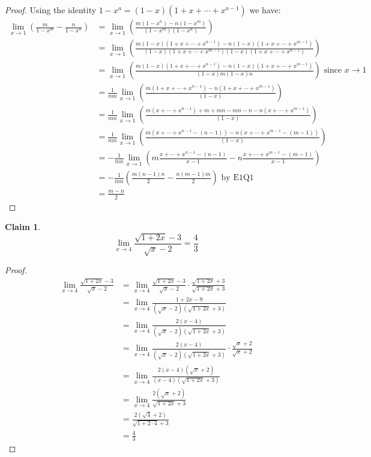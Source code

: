 \documentclass{homework}
\newcommand{\ra}{\rightarrow}
\newcommand{\?}{\stackrel{?}{=}}
\theoremstyle{definition}
\newtheorem*{claim}{Claim}
\begin{document}
\begin{proof}
    Using the identity $1-x^a=(1-x)(1+x+\cdots+x^{a-1})$ we have:
    \begin{align*}
        \lim_{x\ra1}\left( \frac{m}{1-x^m}-\frac{n}{1-x^n} \right) &= \lim_{x\ra1}\left( \frac{m(1-x^n)-n(1-x^m)}{(1-x^m)(1-x^n)} \right)\\
        &=\lim_{x\ra1}\left( \frac{m(1-x)(1+x+\cdots+x^{n-1})-n(1-x)(1+x+\cdots+x^{m-1})}{(1-x)(1+x+\cdots+x^{m-1})(1-x)(1+x+\cdots+x^{n-1})} \right)\\
        &=\lim_{x\ra1}\left( \frac{m(1-x)(1+x+\cdots+x^{n-1})-n(1-x)(1+x+\cdots+x^{m-1})}{(1-x)m(1-x)n} \right)\text{ since $x\ra1$}\\
        &=\frac1{mn}\lim_{x\ra1}\left( \frac{m(1+x+\cdots+x^{n-1})-n(1+x+\cdots+x^{m-1})}{(1-x)} \right)\\
        &=\frac1{mn}\lim_{x\ra1}\left( \frac{m(x+\cdots+x^{n-1})+m+mn-mn-n-n(x+\cdots+x^{m-1})}{(1-x)} \right)\\
        &=\frac1{mn}\lim_{x\ra1}\left( \frac{m(x+\cdots+x^{n-1}-(n-1))-n(x+\cdots+x^{m-1}-(m-1))}{(1-x)} \right)\\
        &=-\frac1{mn}\lim_{x\ra1}\left( m\frac{x+\cdots+x^{n-1}-(n-1)}{x-1}-n\frac{x+\cdots+x^{m-1}-(m-1)}{x-1} \right)\\
        &=-\frac1{mn}\left( \frac{m(n-1)n}{2} - \frac{n(m-1)m}{2}\right) \text{ by E1Q1}\\
        &=\frac{m-n}{2}
    \end{align*}
\end{proof}



\question[3] 

\begin{claim}
    \[\lim_{x\ra4}\frac{\sqrt{1+2x}-3}{\sqrt{x}-2}=\frac43\]
\end{claim}

\begin{proof}
    \begin{align*}
        \lim_{x\ra4}\frac{\sqrt{1+2x}-3}{\sqrt{x}-2}&=\lim_{x\ra4}\frac{\sqrt{1+2x}-3}{\sqrt{x}-2}\cdot\frac{\sqrt{1+2x}+3}{\sqrt{1+2x}+3}\\
        &=\lim_{x\ra4}\frac{1+2x-9}{(\sqrt{x}-2)(\sqrt{1+2x}+3)}\\
        &=\lim_{x\ra4}\frac{2(x-4)}{(\sqrt{x}-2)(\sqrt{1+2x}+3)}\\
        &=\lim_{x\ra4}\frac{2(x-4)}{(\sqrt{x}-2)(\sqrt{1+2x}+3)}\cdot\frac{\sqrt{x}+2}{\sqrt{x}+2}\\
        &=\lim_{x\ra4}\frac{2(x-4)(\sqrt{x}+2)}{(x-4)(\sqrt{1+2x}+3)}\\
        &=\lim_{x\ra4}\frac{2(\sqrt{x}+2)}{\sqrt{1+2x}+3}\\
        &=\frac{2(\sqrt{4}+2)}{\sqrt{1+2\cdot4}+3}\\
        &=\frac43
    \end{align*}
\end{proof}
\end{document}

